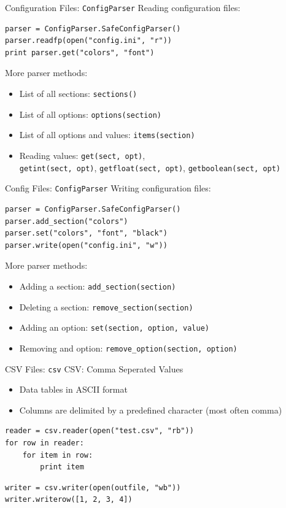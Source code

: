 \begin{frame}[fragile]{Configuration Files: \texttt{ConfigParser}}
Reading configuration files:
\begin{lstlisting}[style=Python]
parser = ConfigParser.SafeConfigParser()
parser.readfp(open("config.ini", "r"))
print parser.get("colors", "font")
\end{lstlisting}
More parser methods:
\begin{itemize}
\item List of all sections: \texttt{sections()}
\item List of all options: \texttt{options(section)}
\item List of all options and values: \texttt{items(section)}
\item Reading values: \texttt{get(sect, opt)}, \\
\texttt{getint(sect, opt)}, \texttt{getfloat(sect, opt)}, \texttt{getboolean(sect, opt)}
\end{itemize}
\end{frame}

\begin{frame}[fragile]{Config Files: \texttt{ConfigParser}}
Writing configuration files:
\begin{lstlisting}[style=Python]
parser = ConfigParser.SafeConfigParser()
parser.add_section("colors")
parser.set("colors", "font", "black")
parser.write(open("config.ini", "w"))
\end{lstlisting}
More parser methods:
\begin{itemize}
\item Adding a section: \texttt{add\_section(section)}
\item Deleting a section: \texttt{remove\_section(section)}
\item Adding an option: \texttt{set(section, option, value)}
\item Removing and option: \texttt{remove\_option(section, option)}
\end{itemize}
\end{frame}

\begin{frame}[fragile]{CSV Files: \texttt{csv}}
CSV: Comma Seperated Values
\begin{itemize}
\item Data tables in ASCII format
\item Columns are delimited by a predefined character (most often comma)
\end{itemize}
\begin{lstlisting}[style=Python]
reader = csv.reader(open("test.csv", "rb"))
for row in reader:
    for item in row: 
        print item
\end{lstlisting}
\begin{lstlisting}[style=Python]
writer = csv.writer(open(outfile, "wb"))
writer.writerow([1, 2, 3, 4])
\end{lstlisting}
\end{frame}

